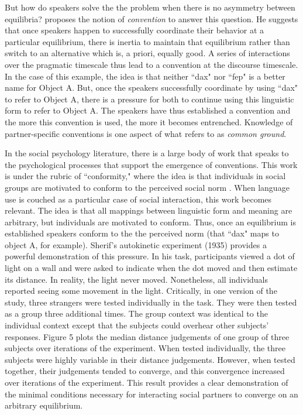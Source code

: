 \documentclass[man, noapacite, 12pt]{apa2}
\begin{document}
But how do speakers solve the the problem when there is no asymmetry between equilibria?  proposes the notion of {\it convention} to answer this question. He suggests that once speakers happen to successfully coordinate their behavior at a particular equilibrium, there is inertia to maintain that equilibrium rather than switch to an alternative which is, a priori, equally good. A series of  interactions over the pragmatic timescale thus lead to a convention at the discourse timescale. In the case of this example, the idea is that neither ``dax" nor ``fep" is a better name for Object A. But, once the speakers successfully coordinate by using ``dax" to refer to Object A, there is a pressure for both to continue using this linguistic form to refer to Object A. The speakers have thus established a convention and the more this convention is used, the more  it becomes entrenched. Knowledge of partner-specific conventions is one aspect of what  refers to as {\it common ground}.

In the social psychology literature, there is a large body of work that speaks to the psychological processes that support the emergence of conventions. This work is under the rubric of ``conformity," where the idea is that individuals in social groups are motivated to conform to the perceived social norm  \cite{cialdini2004social}. When language use is couched as a particular case of social interaction, this work becomes relevant. The idea is that all mappings between linguistic form and meaning are arbitrary, but individuals are motivated to conform. Thus, once an equilibrium is established speakers conform to the the perceived norm (that ``dax" maps to object A, for example).  Sherif's autokinetic experiment (1935)\nocite{sherif1935} provides a powerful demonstration of this pressure. In his task, participants viewed a dot of light on a wall and were asked to indicate when the dot moved and then estimate its distance. In reality, the light never moved. Nonetheless, all individuals reported seeing some movement in the light. Critically, in one version of the study, three strangers  were tested individually in the task. They were then tested as a group three additional times. The group context was identical to the individual context except that the subjects could overhear other subjects' responses. Figure 5 plots the median distance judgements of one group of three subjects over iterations of the experiment. When tested individually, the three subjects were highly variable in their distance judgements. However, when tested together, their judgements tended to converge, and this convergence increased over iterations of the experiment. This result provides a clear demonstration of the minimal conditions necessary for interacting social partners to converge on an arbitrary equilibrium. 
\end{document}
